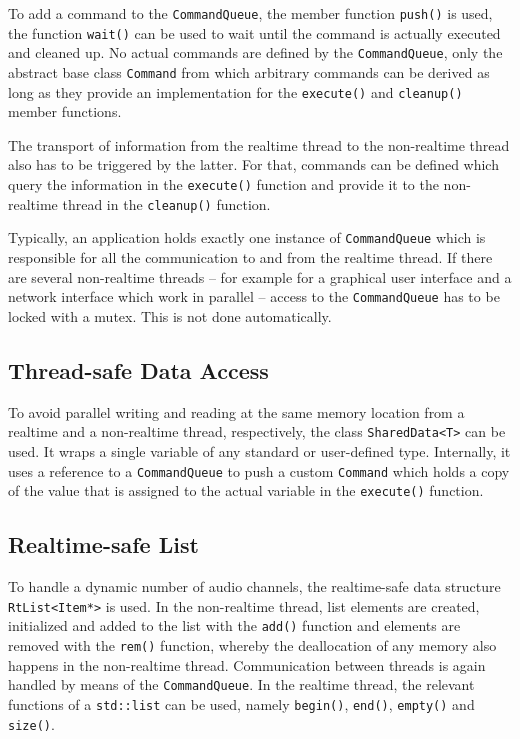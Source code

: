 \documentclass[11pt,letterpaper]{article}
\newcommand{\code}{\texttt}
\begin{document}
To add a command to the \code{CommandQueue}, the member function
\code{push()} is used, the function \code{wait()} can be used to wait until the
command is actually executed and cleaned up.
No actual commands are defined by the \code{CommandQueue}, only the abstract
base class \code{Command} from which arbitrary commands can be derived as long
as they provide an implementation for the \code{execute()} and \code{cleanup()}
member functions.

The transport of information from the realtime thread to the non-realtime thread
also has to be triggered by the latter.
For that, commands can be defined which query the information in the
\code{execute()} function and provide it to the non-realtime thread in the
\code{cleanup()} function.

Typically, an application holds exactly one instance of \code{CommandQueue} which
is responsible for all the communication to and from the realtime thread.
If there are several non-realtime threads -- for example for a graphical user
interface and a network interface which work in parallel -- access to the
\code{CommandQueue} has to be locked with a mutex.
This is not done automatically.

\subsection{Thread-safe Data Access}

\label{sec:shareddata}

To avoid parallel writing and reading at the same memory location from a
realtime and a non-realtime thread, respectively, the class \code{SharedData<T>}
can be used.
It wraps a single variable of any standard or user-defined type.
Internally, it uses a reference to a \code{CommandQueue} to push a custom
\code{Command} which holds a copy of the value that is assigned to the actual
variable in the \code{execute()} function.

\subsection{Realtime-safe List}

\label{sec:rtlist}

To handle a dynamic number of audio channels, the realtime-safe data structure 
\code{RtList<Item*>} is used.
In the non-realtime thread, list elements are created, initialized and added to
the list with the \code{add()} function and elements are removed with the
\code{rem()} function, whereby the deallocation of any memory also happens in
the non-realtime thread.
Communication between threads is again handled by means of the
\code{CommandQueue}.
In the realtime thread, the relevant functions of a \code{std::list} can be used,
namely \code{begin()}, \code{end()}, \code{empty()} and \code{size()}.
\end{document}
